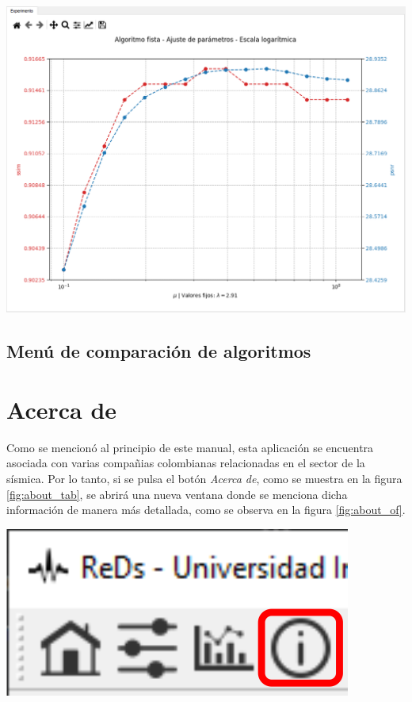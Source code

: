 \documentclass[12pt,twoside,letter]{ol-softwaremanual}
\newenvironment{Figure}
  {\par\medskip\noindent\minipage{\linewidth}}
  {\endminipage\par\medskip}
\begin{document}
\begin{Figure}
    \centering
    \includegraphics[width=1\linewidth]{report-5.png}
    \label{fig:report_5}
\end{Figure}

\subsection{Menú de comparación de algoritmos}

\section{Acerca de}

\begin{multicols}{2}

Como se mencionó al principio de este manual, esta aplicación se encuentra asociada con varias compañias colombianas relacionadas en el sector de la sísmica. Por lo tanto, si se pulsa el botón \emph{Acerca de}, como se muestra en la figura \ref{fig:about_tab}, se abrirá una nueva ventana donde se menciona dicha información de manera más detallada, como se observa en la figura \ref{fig:about_of}.
\vfill\null
\columnbreak
\begin{Figure}
    \centering
    \includegraphics[width=0.5\linewidth]{about-tab.png}
    \label{fig:about_tab}
\end{Figure}

\end{multicols}
\end{document}
